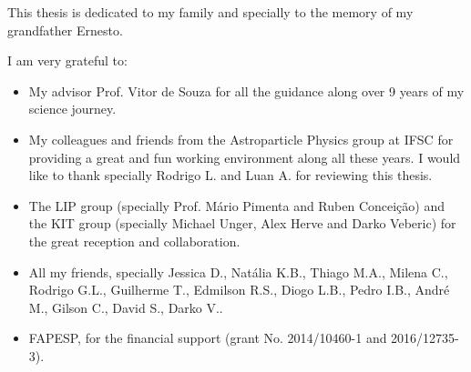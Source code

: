 \begin{agradecimentos}
  This thesis is dedicated to my family and specially to the memory of my grandfather Ernesto.

  I am very grateful to:
  \begin{itemize}
  \item My advisor Prof. Vitor de Souza for all the guidance along over 9 years of my science journey.
  \item My colleagues and friends from the Astroparticle Physics group at IFSC for providing a great and fun working environment along all these years. I would like to thank specially Rodrigo L. and Luan A. for reviewing this thesis.  
  \item The LIP group (specially Prof. Mário Pimenta and Ruben Conceição) and the KIT group (specially Michael Unger, Alex Herve and Darko Veberic) for the great reception and collaboration. 
  \item All my friends, specially Jessica D., Natália K.B., Thiago M.A., Milena C., Rodrigo G.L., Guilherme T., Edmilson R.S., Diogo L.B., Pedro I.B., André M., Gilson C., David S., Darko V..   
  \item FAPESP, for the financial support (grant No. 2014/10460-1 and 2016/12735-3).
  \end{itemize}

\end{agradecimentos}
